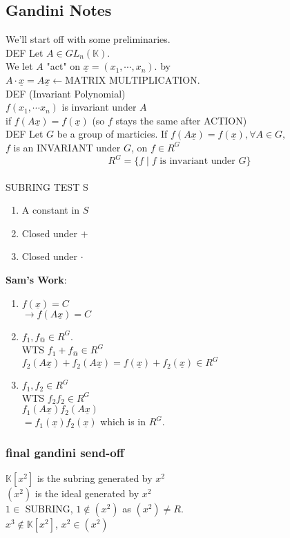 \documentclass[10pt,oneisde]{book}
\newcommand{\K}{\mathbb{K}}
\newcommand{\vpp}{\vspace{0.25cm}\\}
\begin{document}
\subsection*{Gandini Notes}{\newcommand{\ux}{\underline x}

We'll start off with some preliminaries. \vpp
DEF Let $A\in GL_n(\K).$\\
We let $A$ "act" on $\underline x=(x_1,\cdots, x_n)$.
by $A\cdot \ux=A\ux \leftarrow \text{MATRIX MULTIPLICATION}$. \vpp\color{red}
DEF (Invariant Polynomial)\\
$f(x_1,\cdots x_n)$ is invariant under $A$\\
if $f(A\ux)=f(\ux)$ (so $f$ stays the same after ACTION)\color{blue}\vpp
DEF Let $G$ be a group of marticies.
If $f(A\ux)=f(\ux), \forall A\in G,$\\
$f$ is an INVARIANT under $G$, on $f\in R^G$
$$R^G=\{f\mid f\text{ is invariant under } G\}$$\vpp\color{sasha}
SUBRING TEST S 
\begin{enumerate}
    \item A constant in $S$
    \item Closed under $+$
    \item Closed under $\cdot$
\end{enumerate}
\color{sam}
\textbf{Sam's Work}:
\begin{enumerate}
    \item $f(\ux)=C$\\
        $\rightarrow f(A\ux)=C$
    \item $f_1,f_@\in R^G$.\\
        WTS $f_1+f_@\in R^G$\\
        $f_2(A\ux)+f_2(A\ux)=f(\ux)+f_2(\ux)\in R^G$\\
    \item $f_1,f_2\in R^G$\\
        WTS $f_2f_2\in R^G$\\
        $f_1(A\ux)f_2(A\ux)$\\
        $=f_1(\ux)f_2(\ux)$ which is in $R^G$. 
\end{enumerate}\color{black}
\subsubsection*{final gandini send-off}
$\K[x^2]$ is the \color{red} subring generated by $x^2$\color{black}\\
$(x^2)$ is the \color{red} ideal generated by $x^2$\\
\color{sasha}$1\in $ SUBRING, \; $1\notin (x^2)$ as $(x^2)\neq R$. \\
\color{darkgreen}$x^3\notin \K[x^2]$, \; $x^2\in (x^2)$
}
\end{document}
